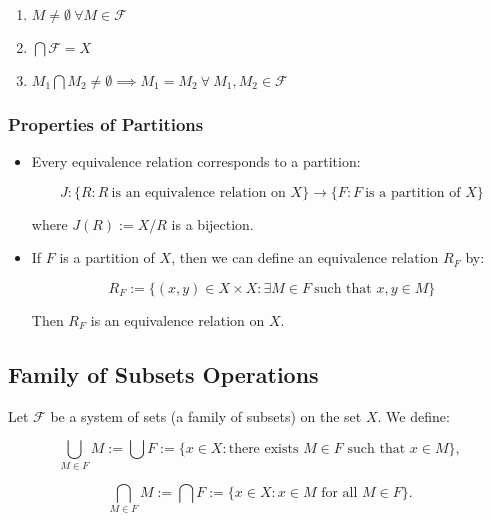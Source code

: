 \begin{enumerate}
	
	\item \(M \neq  \emptyset\ \forall M \in \mathscr{F}\)
 
	\item \(\bigcap \mathscr{F} = X\)
 
	\item \(M_1 \bigcap M_2 \ne \emptyset \implies M_1 = M_2\ \forall\ M_1, M_2 \in \mathscr{F} \) 

\end{enumerate}

\subsubsection{Properties of Partitions}

\begin{itemize}

	\item Every equivalence relation corresponds to a partition:

		  \[
		      J: \{ R : R\ \text{is an equivalence relation on } X\} \to \{ F: F\ \text{is a partition of } X\}
	      \]

	      where \( J(R) := X / R \) is a bijection.

	\item If \( F \) is a partition of \( X \), then we can define an equivalence relation \( R_F \) by:
	      
		  \[
		      R_F := \{ (x, y) \in X \times X : \exists M \in F\ \text{such that } x, y \in M \}
	      \]
	      
		  Then \( R_F \) is an equivalence relation on \( X \).

\end{itemize}


\subsection{Family of Subsets Operations}

Let \(\mathscr{F}\) be a system of sets (a family of subsets) on the set \( X \). We define:

\[
	\bigcup_{M \in F} M := \bigcup F := \{ x \in X : \text{there exists } M \in F \text{ such that } x 
	\in M \} ,
\]

\[
	\bigcap_{M \in F} M := \bigcap F := \{ x \in X : x \in M \text{ for all } M \in F \} .
\]